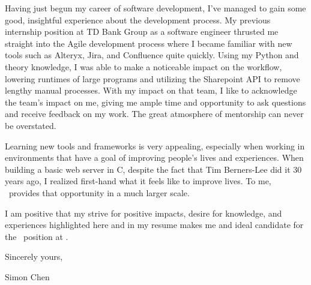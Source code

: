 \documentclass{article}
\begin{document}
Having just begun my career of software development, I've managed to gain some good, insightful experience about the development process. My previous internship position at TD Bank Group as a software engineer thrusted me straight into the Agile development process where I became familiar with new tools such as Alteryx, Jira, and Confluence quite quickly. Using my Python and theory knowledge, I was able to make a noticeable impact on the workflow, lowering runtimes of large programs and utilizing the Sharepoint API to remove lengthy manual processes. With my impact on that team, I like to acknowledge the team's impact on me, giving me ample time and opportunity to ask questions and receive feedback on my work. The great atmosphere of mentorship can never be overstated.

Learning new tools and frameworks is very appealing, especially when working in environments that have a goal of improving people's lives and experiences. When building a basic web server in C, despite the fact that Tim Berners-Lee did it 30 years ago, I realized first-hand what it feels like to improve lives. To me, \compname\ provides that opportunity in a much larger scale. \complive 

I am positive that my strive for positive impacts, desire for knowledge, and experiences highlighted here and in my resume makes me and ideal candidate for the \posname\ position at \compname.

\bigskip %

Sincerely yours,

\vspace{50pt} %

Simon Chen
\end{document}
